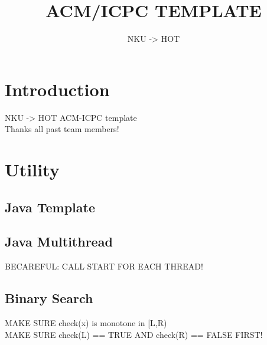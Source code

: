 \documentclass[a4paper]{article}
\begin{document}
  
\title{ACM/ICPC TEMPLATE}  
\author{NKU -> HOT}    
\maketitle
\tableofcontents
\section{Introduction}
NKU -> HOT ACM-ICPC template \\
Thanks all past team members! 
\section{Utility}
\subsection{Java Template}

\subsection{Java Multithread}
BECAREFUL: CALL START FOR EACH THREAD!

\subsection{Binary Search}
MAKE SURE check(x) is monotone in [L,R)\\
MAKE SURE check(L) == TRUE AND check(R) == FALSE FIRST!

\end{document}
